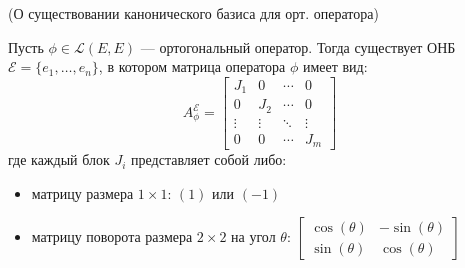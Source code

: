 \begin{shth}
    \begin{theorem} (О существовании канонического базиса для орт. оператора)
    \leavevmode \nl 
    
        Пусть \(\phi \in \mathcal{L}(E, E)\) — ортогональный оператор. Тогда существует ОНБ \(\mathcal{E} = \{e_1, \ldots, e_n\}\), в котором матрица оператора \(\phi\) имеет вид:
\[
A_{\phi}^{\mathcal{E}} = \begin{bmatrix}
J_1 & 0 & \cdots & 0 \\
0 & J_2 & \cdots & 0 \\
\vdots & \vdots & \ddots & \vdots \\
0 & 0 & \cdots & J_m
\end{bmatrix}
\]
где каждый блок \(J_i\) представляет собой либо:
\begin{itemize}
    \item матрицу размера \(1 \times 1\): \((1)\) или \((-1)\)
    \item матрицу поворота размера \(2 \times 2\) на угол \(\theta\): 
    \(\begin{bmatrix} \cos(\theta) & -\sin(\theta) \\ \sin(\theta) & \cos(\theta) \end{bmatrix}\)
\end{itemize}
    \end{theorem}
\end{shth}

